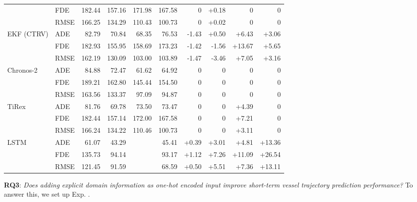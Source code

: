 \begin{table}[htbp]
\begin{tabular}{llrrrrrrrr}
& FDE  & 182.44 & 157.16 & 171.98 & 167.58 & 0 & +0.18 & 0 & 0 \\
& RMSE & 166.25 & 134.29 & 110.43 & 100.73 & 0 & +0.02 & 0 & 0 \\
\midrule
EKF (CTRV)          
& ADE  & 82.79 & 70.84 & 68.35 & 76.53 & -1.43 & +0.50 & +6.43 & +3.06 \\
& FDE  & 182.93 & 155.95 & 158.69 & 173.23 & -1.42 & -1.56 & +13.67 & +5.65 \\
& RMSE & 162.19 & 130.09 & 103.00 & 103.89 & -1.47 & -3.46 & +7.05 & +3.16 \\
\midrule
Chronos-2           
& ADE  & 84.88 & 72.47 & 61.62 & 64.92 & 0 & 0 & 0 & 0 \\
& FDE  & 189.21 & 162.80 & 145.44 & 154.50 & 0 & 0 & 0 & 0 \\
& RMSE & 163.56 & 133.37 & 97.09 & 94.87 & 0 & 0 & 0 & 0 \\
\midrule
TiRex               
& ADE  & 81.76 & 69.78 & 73.50 & 73.47 & 0 & 0 & +4.39 & 0 \\
& FDE  & 182.44 & 157.14 & 172.00 & 167.58 & 0 & 0 & +7.21 & 0 \\
& RMSE & 166.24 & 134.22 & 110.46 & 100.73 & 0 & 0 & +3.11 & 0 \\
\midrule
LSTM                

& ADE  & 61.07 & 43.29 & \cellcolor{cyan!15}{32.09} & 45.41 & +0.39 & +3.01 & \cellcolor{orange!15}+4.81 & \cellcolor{orange!15}+13.36 \\
& FDE  & 135.73 & 94.14 & \cellcolor{cyan!15}{70.23} & 93.17 & +1.12 & +7.26 & \cellcolor{orange!15}+11.09 & \cellcolor{orange!15}+26.54 \\
& RMSE & 121.45 & 91.59 & \cellcolor{cyan!15}{55.85} & 68.59 & +0.50 & +5.51 & \cellcolor{orange!15}+7.36 & \cellcolor{orange!15}+13.11 \\
\bottomrule
\end{tabular}
\end{table}

\label{sec:exp3}

\FloatBarrier
\textbf{RQ3}: \textit{Does adding explicit domain information as one-hot encoded input improve short-term
vessel trajectory prediction performance?}
To answer this, we set up Exp. .
